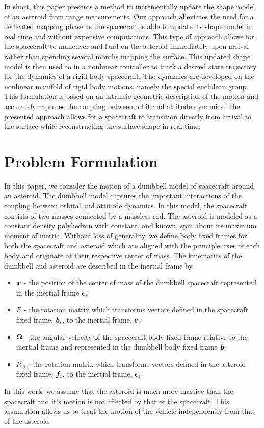 \documentclass[letterpaper, paper,11pt]{AAS}		%
\begin{document}
In short, this paper presents a method to incrementally update the shape  model of an asteroid from range measurements. 
Our approach alleviates the need for a dedicated mapping phase as the spacecraft is able to update its shape model in real time and without expensive computations.
This type of approach allows for the spacecraft to maneuver and land on the asteroid immediately upon arrival rather than spending several months mapping the surface.
This updated shape model is then used to in a nonlinear controller to track a desired state trajectory for the dynamics of a rigid body spacecraft.
The dynamics are developed on the nonlinear manifold of rigid body motions, namely the special euclidean group.
This formulation is based on an intrinsic geometric description of the motion and accurately captures the coupling between orbit and attitude dynamics. 
The presented approach allows for a spacecraft to transition directly from arrival to the surface while reconstructing the surface shape in real time.


\section{Problem Formulation}\label{sec:problem}

In this paper, we consider the motion of a dumbbell model of spacecraft around an asteroid.
The dumbbell model captures the important interactions of the coupling between orbital and attitude dynamics.
In this model, the spacecraft consists of two masses connected by a massless rod.
The asteroid is modeled as a constant density polyhedron with constant, and known, spin about its maximum moment of inertia. 
Without loss of generality, we define body fixed frames for both the spacecraft and asteroid which are aligned with the principle axes of each body and originate at their respective center of mass. 
The kinematics of the dumbbell and asteroid are described in the inertial frame by
\begin{itemize}
    \item \( \bm{x} \) - the position of the center of mass of the dumbbell spacecraft represented in the inertial frame \( \bm{e}_i\)
    \item \( R \) - the rotation matrix which transforms vectors defined in the spacecraft fixed frame, \( \bm{b}_i \), to the inertial frame, \( \bm{e}_i \)
    \item \( \bm{\Omega} \) - the angular velocity of the spacecraft body fixed frame relative to the inertial frame and represented in the dumbbell body fixed frame \( \bm{b}_i \)
    \item \( R_A \) - the rotation matrix which transforms vectors defined in the asteroid fixed frame, \( \bm{f}_i \), to the inertial frame, \( \bm{e}_i \)
\end{itemize}
In this work, we assume that the asteroid is much more massive than the spacecraft and it's motion is not affected by that of the spacecraft.
This assumption allows us to treat the motion of the vehicle independently from that of the asteroid. 
\end{document}

